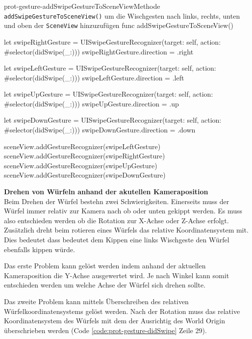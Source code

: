 \begin{description}
    \begin{code}{prot-gesture-addSwipeGestureToSceneView}{Methode \texttt{addSwipeGestureToSceneView()} um die Wischgesten nach links, rechts, unten und oben der \texttt{SceneView} hinzuzufügen}
        func addSwipeGestureToSceneView() {
            let swipeRightGesture = UISwipeGestureRecognizer(target: self, action: #selector(didSwipe(_:)))
            swipeRightGesture.direction = .right
            
            let swipeLeftGesture = UISwipeGestureRecognizer(target: self, action: #selector(didSwipe(_:)))
            swipeLeftGesture.direction = .left
            
            let swipeUpGesture = UISwipeGestureRecognizer(target: self, action: #selector(didSwipe(_:)))
            swipeUpGesture.direction = .up
            
            let swipeDownGesture = UISwipeGestureRecognizer(target: self, action: #selector(didSwipe(_:)))
            swipeDownGesture.direction = .down
            
            sceneView.addGestureRecognizer(swipeLeftGesture)
            sceneView.addGestureRecognizer(swipeRightGesture)
            sceneView.addGestureRecognizer(swipeUpGesture)
            sceneView.addGestureRecognizer(swipeDownGesture)
        }
    \end{code}

    \textbf{Drehen von Würfeln anhand der akutellen Kameraposition}\\
    Beim Drehen der Würfel bestehn zwei Schwierigkeiten. Einerseits muss der Würfel immer relativ zur Kamera nach ob oder unten gekippt werden. Es muss also entschieden werden ob die Rotation zur X-Achse oder Z-Achse erfolgt. Zusätzlich dreht beim rotieren eines Würfels das relative Koordinatensystem mit. Dies bedeutet dass bedeutet dem Kippen eine links Wischgeste den Würfel ebenfalls kippen würde.

    Das erste Problem kann gelöst werden indem anhand der aktuellen Kameraposition die Y-Achse ausgewertet wird. Je nach Winkel kann somit entschieden werden um welche Achse der Würfel sich drehen sollte. %

    Das zweite Problem kann mittels Überschreiben des relativen Würfelkoordinatensystems gelöst werden. Nach der Rotation muss das relative Koordinatensystem des Würfels mit dem der Ausrichtig des World Origin überschrieben werden (Code \ref{code:prot-gesture-didSwipe} Zeile 29).


\end{description}
